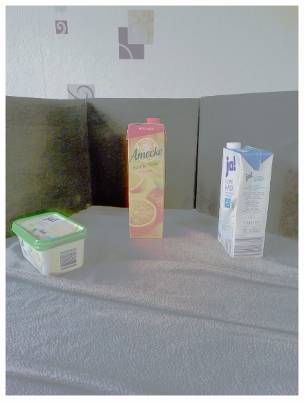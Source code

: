 \documentclass[a4paper,12pt,oneside]{article}
\begin{document}
\begin{figure}[htb]
\begin{minipage}[c]{0.2\textwidth}
\includegraphics[width=\textwidth]{Sources/Bild2_HS.jpg}
\end{minipage}
\hfill
\begin{minipage}[c]{0.08\textwidth}

\end{minipage}
\end{figure}
\end{document}

